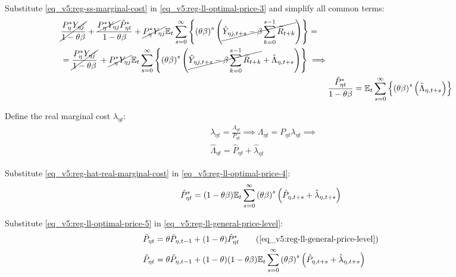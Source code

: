 \documentclass[../thesis.tex]{subfiles}
\begin{document}
Substitute \ref{eq_v5:reg-ss-marginal-cost} in \ref{eq_v5:reg-ll-optimal-price-3} and simplify all common terms:
\begin{align}
	\begin{split}
		& \cancel{\frac{P_{\eta}^{\ast} Y_{\eta j}}{1-\theta\beta}} + \frac{ \cancel{P_{\eta}^{\ast} Y_{\eta j}} \hat{P}_{\eta t}^{\ast}}{1- \theta \beta} + \cancel{P_{\eta}^{\ast} Y_{\eta j}} {\mathbb{E}_{t}} \sum_{s=0}^{\infty} \left\{ \left( \theta \beta \right)^s \left( \cancel{\hat{Y}_{\eta j, t+s} - \beta \sum_{k=0}^{s-1} \widetilde{R}_{t+k}} \right) \right\} = 
		\\
		& = \cancel{\frac{P_{\eta}^{\ast} Y_{\eta j}}{1-\theta\beta}} \, + \cancel{P_{\eta}^{\ast} Y_{\eta j}} {\mathbb{E}_{t}} \sum_{s=0}^{\infty} \left\{ \left( \theta \beta \right)^s \left( \cancel{\hat{Y}_{\eta j, t+s} - \beta \sum_{k=0}^{s-1} \widetilde{R}_{t+k}} + \hat{\Lambda}_{\eta, t+s} \right) \right\} \implies	
	\end{split} \nonumber \\
	& \frac{ \hat{P}_{\eta t}^{\ast}}{1- \theta \beta} = {\mathbb{E}_{t}} \sum_{s=0}^{\infty} \left\{ \left( \theta \beta \right)^s \left( \hat{\Lambda}_{\eta, t+s} \right) \right\} \label{eq_v5:reg-ll-optimal-price-4}
\end{align}



Define the real marginal cost $\lambda_{\eta t}$:
\begin{align}
	& \lambda_{\eta t} = \frac{\Lambda_{\eta t}}{P_{\eta t}} \implies \Lambda_{\eta t} = P_{\eta t} \lambda_{\eta t} \implies \nonumber \\
	& \hat{\Lambda}_{\eta t} = \hat{P}_{\eta t} + \hat{\lambda}_{\eta t} \label{eq_v5:reg-hat-real-marginal-cost}
\end{align}

Substitute \ref{eq_v5:reg-hat-real-marginal-cost} in \ref{eq_v5:reg-ll-optimal-price-4}:
\begin{align}
	\hat{P}_{\eta t}^{\ast} = (1- \theta \beta) {\mathbb{E}_{t}} \sum_{s=0}^{\infty} \left( \theta \beta \right)^s \left( \hat{P}_{\eta, t+s} + \hat{\lambda}_{\eta, t+s} \right) \label{eq_v5:reg-ll-optimal-price-5}
\end{align}

Substitute \ref{eq_v5:reg-ll-optimal-price-5} in \ref{eq_v5:reg-ll-general-price-level}:
\begin{align}
	\hat{P}_{\eta t} &= \theta \hat{P}_{\eta, t-1} + (1-\theta) \hat{P}_{\eta t}^{\ast} \tag{\ref{eq_v5:reg-ll-general-price-level}}\\
	\hat{P}_{\eta t} &= \theta \hat{P}_{\eta, t-1} + (1-\theta) (1- \theta \beta) \E \sum_{s=0}^{\infty} \left( \theta \beta \right)^s \left( \hat{P}_{\eta, t+s} + \hat{\lambda}_{\eta, t+s} \right) \label{eq_v5:reg-ll-general-price-level-2}
\end{align}
\end{document}
